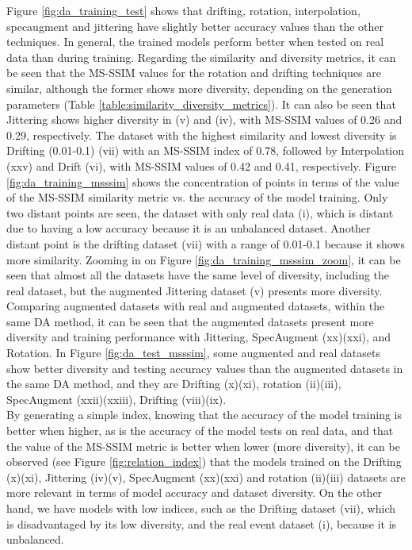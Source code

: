 \documentclass[journal]{IEEEtran}
\begin{document}
Figure \ref{fig:da_training_test} shows that drifting, rotation, interpolation, specaugment and jittering have slightly better accuracy values than the other techniques. In general, the trained models perform better when tested on real data than during training.
Regarding the similarity and diversity metrics, it can be seen that the MS-SSIM values for the rotation and drifting techniques are similar, although the former shows more diversity, depending on the generation parameters (Table \ref{table:similarity_diversity_metrics}).
It can also be seen that Jittering shows higher diversity in (v) and (iv), with MS-SSIM values of 0.26 and 0.29, respectively.
The dataset with the highest similarity and lowest diversity is Drifting (0.01-0.1) (vii) with an MS-SSIM index of 0.78, followed by Interpolation (xxv) and Drift (vi), with MS-SSIM values of 0.42 and 0.41, respectively.
Figure \ref{fig:da_training_msssim} shows the concentration of points in terms of the value of the MS-SSIM similarity metric vs. the accuracy of the model training. Only two distant points are seen, the dataset with only real data (i), which is distant due to having a low accuracy because it is an unbalanced dataset. Another distant point is the drifting dataset (vii) with a range of 0.01-0.1 because it shows more similarity. Zooming in on Figure \ref{fig:da_training_msssim_zoom}, it can be seen that almost all the datasets have the same level of diversity, including the real dataset, but the augmented Jittering dataset (v) presents more diversity. Comparing augmented datasets with real and augmented datasets, within the same DA method, it can be seen that the augmented datasets present more diversity and training performance with Jittering, SpecAugment (xx)(xxi), and Rotation.
In Figure \ref{fig:da_test_msssim}, some augmented and real datasets show  better diversity and testing accuracy values than the augmented datasets in the same DA method, and they are Drifting (x)(xi), rotation (ii)(iii), SpecAugment (xxii)(xxiii), Drifting (viii)(ix).\\
By generating a simple index, knowing that the accuracy of the model training is better when higher, as is the accuracy of the model tests on real data, and that the value of the MS-SSIM metric is better when lower (more diversity), it can be observed (see Figure \ref{fig:relation_index}) that the models trained on the Drifting (x)(xi), Jittering (iv)(v), SpecAugment (xx)(xxi) and rotation (ii)(iii) datasets are more relevant in terms of model accuracy and dataset diversity. On the other hand, we have models with low indices, such as the Drifting dataset (vii), which is disadvantaged by its low diversity, and the real event dataset (i), because it is unbalanced.
\end{document}
